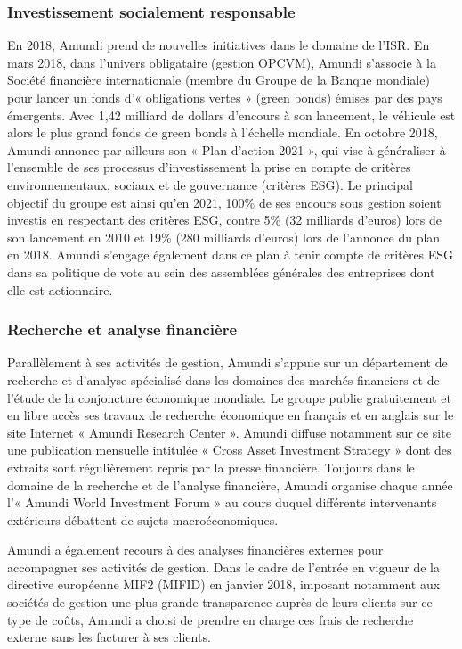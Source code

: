 \subsubsection{Investissement socialement responsable}
\par En 2018, Amundi prend de nouvelles initiatives dans le domaine de l'ISR. En mars 2018, dans l'univers obligataire (gestion OPCVM), Amundi s’associe à la Société financière internationale (membre du Groupe de la Banque mondiale) pour lancer un fonds d'« obligations vertes » (green bonds) émises par des pays émergents. Avec 1,42 milliard de dollars d'encours à son lancement, le véhicule est alors le plus grand fonds de green bonds à l'échelle mondiale. En octobre 2018, Amundi annonce par ailleurs son « Plan d'action 2021 », qui vise à généraliser à l'ensemble de ses processus d'investissement la prise en compte de critères environnementaux, sociaux et de gouvernance (critères ESG). Le principal objectif du groupe est ainsi qu'en 2021, 100\% de ses encours sous gestion soient investis en respectant des critères ESG, contre 5\% (32 milliards d'euros) lors de son lancement en 2010 et 19\% (280 milliards d'euros) lors de l'annonce du plan en 2018. Amundi s'engage également dans ce plan à tenir compte de critères ESG dans sa politique de vote au sein des assemblées générales des entreprises dont elle est actionnaire.

\subsubsection{Recherche et analyse financière}
\par Parallèlement à ses activités de gestion, Amundi s'appuie sur un département de recherche et d'analyse spécialisé dans les domaines des marchés financiers et de l'étude de la conjoncture économique mondiale. Le groupe publie gratuitement et en libre accès ses travaux de recherche économique en français et en anglais sur le site Internet « Amundi Research Center ». Amundi diffuse notamment sur ce site une publication mensuelle intitulée « Cross Asset Investment Strategy » dont des extraits sont régulièrement repris par la presse financière. Toujours dans le domaine de la recherche et de l'analyse financière, Amundi organise chaque année l'« Amundi World Investment Forum » au cours duquel différents intervenants extérieurs débattent de sujets macroéconomiques.
\par Amundi a également recours à des analyses financières externes pour accompagner ses activités de gestion. Dans le cadre de l'entrée en vigueur de la directive européenne MIF2 (MIFID) en janvier 2018, imposant notamment aux sociétés de gestion une plus grande transparence auprès de leurs clients sur ce type de coûts, Amundi a choisi de prendre en charge ces frais de recherche externe sans les facturer à ses clients.

